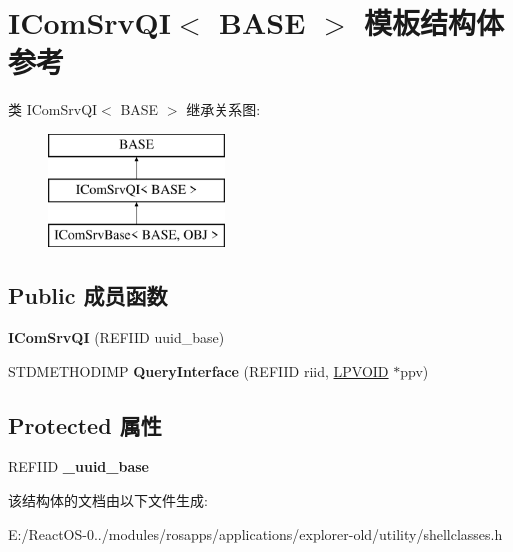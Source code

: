 \hypertarget{struct_i_com_srv_q_i}{}\section{I\+Com\+Srv\+QI$<$ B\+A\+SE $>$ 模板结构体 参考}
\label{struct_i_com_srv_q_i}
类 I\+Com\+Srv\+QI$<$ B\+A\+SE $>$ 继承关系图\+:\begin{figure}[H]
\begin{center}
\leavevmode
\includegraphics[height=3.000000cm]{struct_i_com_srv_q_i}
\end{center}
\end{figure}
\subsection*{Public 成员函数}
\begin{DoxyCompactItemize}
\item 
\mbox{\label{struct_i_com_srv_q_i_a3155a17854e16e01412e9c43c649e156}} 
{\bfseries I\+Com\+Srv\+QI} (R\+E\+F\+I\+ID uuid\+\_\+base)
\item 
\mbox{\label{struct_i_com_srv_q_i_a5ba55b62acb5d093a881f6badbb2d0b5}} 
S\+T\+D\+M\+E\+T\+H\+O\+D\+I\+MP {\bfseries Query\+Interface} (R\+E\+F\+I\+ID riid, \hyperlink{interfacevoid}{L\+P\+V\+O\+ID} $\ast$ppv)
\end{DoxyCompactItemize}
\subsection*{Protected 属性}
\begin{DoxyCompactItemize}
\item 
\mbox{\label{struct_i_com_srv_q_i_af12a08a0e176ddc462dbea8a2397431b}} 
R\+E\+F\+I\+ID {\bfseries \+\_\+uuid\+\_\+base}
\end{DoxyCompactItemize}


该结构体的文档由以下文件生成\+:\begin{DoxyCompactItemize}
\item 
E\+:/\+React\+O\+S-\/0../modules/rosapps/applications/explorer-\/old/utility/shellclasses.\+h\end{DoxyCompactItemize}
